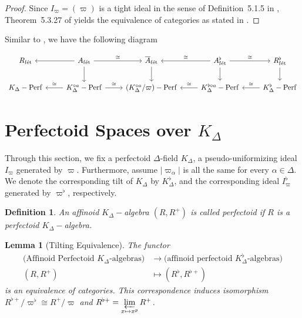 \documentclass[12pts,a4paper]{amsart}
\newtheorem{lemma}[proposition]{Lemma}
\newtheorem{definition}[proposition]{Definition}
\DeclareMathOperator{\Perf}{Perf}
\DeclareMathOperator{\fet}{f\acute{e}t}
\begin{document}
\begin{proof}
  Since $I_\varpi=(\varpi)$ is a tight ideal in the sense of Definition~5.1.5 in \cite{ART}, Theorem~5.3.27 of \cite{ART} yields the equivalence of categories as stated in \cite{Sch}. 
\end{proof}  

Similar to \cite{Sch}, we have the following diagram

\[
\begin{tikzcd}
   R_{\fet} &\arrow[l] A_{\fet}\arrow[d]\arrow[r,"\cong"] & \overline{A}_{\fet}\arrow[d] & \arrow[l,swap,"\cong"] A^\flat_{\fet}\arrow[d] \arrow[r,"\cong"] & R^\flat_{\fet}\arrow[d]\\
   K_\Delta-\Perf  &\arrow[l,swap,"\cong"]K^{\circ a}_\Delta-\Perf\arrow[r,"\cong"] & (K^{\circ a}_\Delta/\varpi)-\Perf &\arrow[l,swap,"\cong"] K^{\flat\circ a}_\Delta-\Perf &\arrow[l,swap,"\cong"] K^\flat_\Delta-\Perf 
\end{tikzcd} 
\]



\section{Perfectoid Spaces over $K_\Delta$}

Through this section, we fix a perfectoid $\Delta$-field $K_\Delta$, a pseudo-uniformizing ideal $I_\varpi$ generated by $\varpi$. Furthermore, assume $|\varpi_\alpha|$ is all the same for every $\alpha\in\Delta$. We denote the corresponding tilt of $K_\Delta$ by $K^\flat_\Delta$, and the corresponding ideal $I^\flat_\varpi$ generated by  $\varpi^\flat$, respectively.

\begin{definition}
    An affinoid $K_\Delta-$algebra $(R,R^+)$ is called perfectoid if $R$ is a perfectoid $K_\Delta-$algebra.
\end{definition}

\begin{lemma}[Tilting Equivalence]
   The functor
   \begin{align*}
       \text{(Affinoid Perfectoid $K_\Delta$-algebras)}&\to \text{(affinoid perfectoid $K^\flat_\Delta$-algebras)}\\
       (R,R^+)&\mapsto (R^\flat,R^{\flat+})
    \end{align*}
   is an equivalence of categories. This correspondence induces isomorphism $R^{\flat+}/\varpi^\flat\cong R^+/\varpi$ and $R^{\flat+}=\varprojlim\limits_{x\mapsto x^p}R^+$.
\end{lemma}
\end{document}
